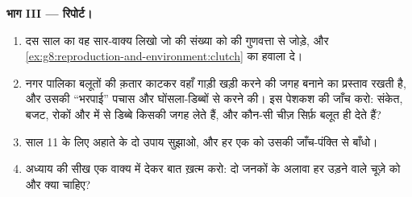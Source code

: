 \begin{problem}[{सप्ताहांत समस्या --- नीली चिड़ियों के दस साल,
डिब्बा-दर-डिब्बा जाँचे हुए}]
\medskip\noindent\textbf{भाग III --- रिपोर्ट।}
\begin{enumerate}[resume]
  \item दस साल का वह सार-वाक्य लिखो जो  की संख्या को  की
        गुणवत्ता से जोड़े, और
        \cref{ex:g8:reproduction-and-environment:clutch} का हवाला दे।
  \item नगर पालिका बलूतों की क़तार काटकर वहाँ गाड़ी खड़ी करने की जगह
        बनाने का प्रस्ताव रखती है, और उसकी ``भरपाई'' पचास और
        घोंसला-डिब्बों से करने की। इस पेशकश की जाँच करो: संकेत, बजट,
        रोकों और  में से डिब्बे किसकी जगह लेते हैं, और कौन-सी
        चीज़ सिर्फ़ बलूत ही देते हैं?
  \item साल 11 के लिए अहाते के दो उपाय सुझाओ, और हर एक को उसकी
        जाँच-पंक्ति से बाँधो।
  \item अध्याय की सीख एक वाक्य में देकर बात ख़त्म करो: दो जनकों के
        अलावा हर उड़ने वाले चूज़े को और क्या चाहिए?
\end{enumerate}
\end{problem}
